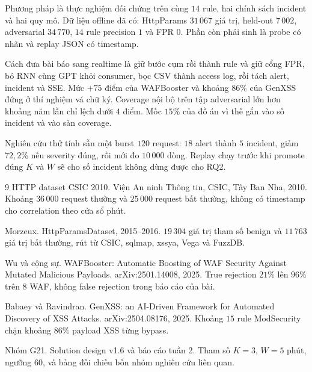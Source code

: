 \documentclass[a4paper,11pt]{article}
\begin{document}
Phương pháp là thực nghiệm đối chứng trên cùng $14$ rule, hai chính sách incident và hai quy mô. Dữ liệu offline đã có: HttpParams $31\,067$ giá trị, held-out $7\,002$, adversarial $34\,770$, $14$ rule precision $1$ và FPR $0$. Phần còn phải sinh là probe có nhãn và replay JSON có timestamp.

Cách đưa bài báo sang realtime là giữ bước cụm rồi thành rule và giữ cổng FPR, bỏ RNN cùng GPT khỏi consumer, bọc CSV thành access log, rồi tách alert, incident và SSE. Mức $+75$ điểm của WAFBooster và khoảng $86\%$ của GenXSS đứng ở thí nghiệm vá chữ ký. Coverage nội bộ trên tập adversarial lớn hơn khoảng năm lần chỉ lệch dưới $4$ điểm. Mốc $15\%$ của đồ án vì thế gắn vào số incident và vào sàn coverage.

Nghiên cứu thử tính sẵn một burst $120$ request: $18$ alert thành $5$ incident, giảm $72{,}2\%$ nếu severity đúng, rồi mới đo $10\,000$ dòng. Replay chạy trước khi promote đúng $K$ và $W$ sẽ cho số incident không dùng được cho RQ2.

\begin{thebibliography}{9}
HTTP dataset CSIC 2010.
Viện An ninh Thông tin, CSIC, Tây Ban Nha, 2010.
Khoảng $36\,000$ request thường và $25\,000$ request bất thường, không có timestamp cho correlation theo cửa sổ phút.

Morzeux.
HttpParamsDataset, 2015--2016.
$19\,304$ giá trị tham số benign và $11\,763$ giá trị bất thường, rút từ CSIC, sqlmap, xssya, Vega và FuzzDB.

Wu và cộng sự.
WAFBooster: Automatic Boosting of WAF Security Against Mutated Malicious Payloads.
arXiv:2501.14008, 2025.
True rejection $21\%$ lên $96\%$ trên $8$ WAF, không false rejection trong báo cáo của bài.

Babaey và Ravindran.
GenXSS: an AI-Driven Framework for Automated Discovery of XSS Attacks.
arXiv:2504.08176, 2025.
Khoảng $15$ rule ModSecurity chặn khoảng $86\%$ payload XSS từng bypass.

Nhóm G21.
Solution design v1.6 và báo cáo tuần 2.
Tham số $K{=}3$, $W{=}5$ phút, ngưỡng $60$, và bảng đối chiếu bốn nhóm nghiên cứu liên quan.
\end{thebibliography}
\end{document}
